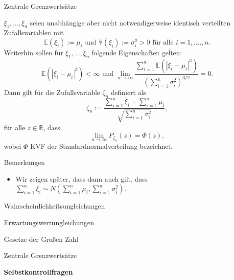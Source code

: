 \documentclass[
  8pt,
  ignorenonframetext,
]{beamer}
\providecommand{\tightlist}{%
  \setlength{\itemsep}{0pt}\setlength{\parskip}{0pt}}
\begin{document}
\begin{frame}{Zentrale Grenzwertsätze}
\protect\hypertarget{zentrale-grenzwertsuxe4tze-4}{}
\footnotesize
\begin{theorem}
\justifying
\normalfont
$\xi_1,...,\xi_n$ seien unabhängige aber nicht notwendigerweise identisch verteilten Zufallsvariablen mit
\begin{equation}
\mathbb{E}(\xi_i) := \mu_i \mbox{ und }
\mathbb{V}(\xi_i) := \sigma^2_i > 0
\mbox{ für alle } i = 1,....,n.
\end{equation}
Weiterhin sollen für $\xi_1,...,\xi_n$ folgende Eigenschaften gelten:
\begin{equation}
\mathbb{E}(|\xi_i - \mu_i|^3) < \infty \mbox{ und }
\lim_{n \to \infty} \frac{\sum_{i=1}^n \mathbb{E}\left(|\xi_i - \mu_i|^3\right)}{(\sum_{i=1}^n \sigma_i^2)^{3/2}} = 0.
\end{equation}
Dann gilt für die Zufallsvariable $\zeta_n$ definiert als
\begin{equation}
\zeta_n := \frac{\sum_{i=1}^n \xi_i - \sum_{i=1}^n \mu_i}{\sqrt{\sum_{i=1}^n \sigma_i^2}},
\end{equation}
für alle $z\in\mathbb{R}$, dass
\begin{equation}
\lim_{n \to \infty} P_{\zeta_n}(z) = \Phi(z),
\end{equation}
wobei $\Phi$ KVF der Standardnormalverteilung bezeichnet.
\end{theorem}

Bemerkungen

\begin{itemize}
\tightlist
\item
  Wir zeigen später, dass dann auch gilt, dass
  \(\sum_{i=1}^n \xi_i \sim N\left(\sum_{i=1}^n \mu_i, \sum_{i=1}^n \sigma_i^2\right)\).
\end{itemize}
\end{frame}

\begin{frame}{}
\protect\hypertarget{section-7}{}
\large
\vfill
{}

Wahrscheinlichkeitsungleichungen

Erwartungswertungleichungen

Gesetze der Großen Zahl

Zentrale Grenzwertsätze

\textbf{Selbstkontrollfragen} \vfill
\end{frame}
\end{document}
